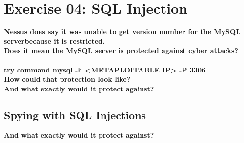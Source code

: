 \section*{Exercise 04: SQL Injection}

\textbf{Nessus does say it was unable to get version number for the MySQL serverbecause it is restricted.}\\
\textbf{\dag Does it mean the MySQL server is protected against cyber attacks?}\\\\
\textbf{try command mysql -h <METAPLOITABLE IP> -P 3306}\\
\textbf{\dag How could that protection look like?}\\
\textbf{\dag And what exactly would it protect against?}


\subsection*{Spying with SQL Injections}
\textbf{\dag And what exactly would it protect against?}
